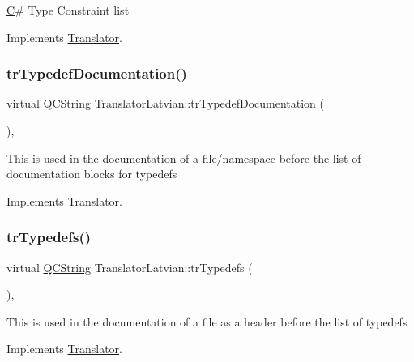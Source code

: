 \mbox{\hyperlink{class_c}{C}}\# Type Constraint list 

Implements \mbox{\hyperlink{class_translator}{Translator}}.

\mbox{\label{class_translator_latvian_a0c2e8f5aa34674ddcdabc807ad43d64e}} 
\subsubsection{\texorpdfstring{trTypedefDocumentation()}{trTypedefDocumentation()}}
{\footnotesize\ttfamily virtual \mbox{\hyperlink{class_q_c_string}{Q\+C\+String}} Translator\+Latvian\+::tr\+Typedef\+Documentation (\begin{DoxyParamCaption}{ }\end{DoxyParamCaption})\hspace{0.3cm}{\ttfamily [inline]}, {\ttfamily [virtual]}}

This is used in the documentation of a file/namespace before the list of documentation blocks for typedefs 

Implements \mbox{\hyperlink{class_translator}{Translator}}.

\mbox{\label{class_translator_latvian_a34f07e680ff02e64b548e73fc4008c92}} 
\subsubsection{\texorpdfstring{trTypedefs()}{trTypedefs()}}
{\footnotesize\ttfamily virtual \mbox{\hyperlink{class_q_c_string}{Q\+C\+String}} Translator\+Latvian\+::tr\+Typedefs (\begin{DoxyParamCaption}{ }\end{DoxyParamCaption})\hspace{0.3cm}{\ttfamily [inline]}, {\ttfamily [virtual]}}

This is used in the documentation of a file as a header before the list of typedefs 

Implements \mbox{\hyperlink{class_translator}{Translator}}.

\mbox{\label{class_translator_latvian_a66321785df3724e8bc4fde55c17b5187}} 
